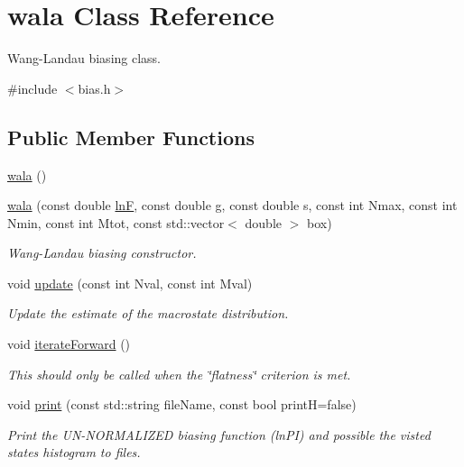 \hypertarget{classwala}{\section{wala Class Reference}
\label{classwala}
}


Wang-\/\-Landau biasing class.  




{\ttfamily \#include $<$bias.\-h$>$}

\subsection*{Public Member Functions}
\begin{DoxyCompactItemize}
\item 
\hyperlink{classwala_a1a4483327eb3527ecc114c075b0b0598}{wala} ()
\item 
\hyperlink{classwala_ac0d2f33ee8226fb4306628a750ed0d14}{wala} (const double \hyperlink{classwala_acb8e59580d97bc3c5b9b4ff45eb6bb9a}{ln\-F}, const double g, const double s, const int Nmax, const int Nmin, const int Mtot, const std\-::vector$<$ double $>$ box)
\begin{DoxyCompactList}\small\item\em Wang-\/\-Landau biasing constructor. \end{DoxyCompactList}\item 
void \hyperlink{classwala_ab439e3f60bea6c54522a870b9ad67acf}{update} (const int Nval, const int Mval)
\begin{DoxyCompactList}\small\item\em Update the estimate of the macrostate distribution. \end{DoxyCompactList}\item 
void \hyperlink{classwala_ae06c2f1475702ec9d1b0a243b7f34e4b}{iterate\-Forward} ()
\begin{DoxyCompactList}\small\item\em This should only be called when the \char`\"{}flatness\char`\"{} criterion is met. \end{DoxyCompactList}\item 
void \hyperlink{classwala_a65569289fac85d0da9c336e17c9d809a}{print} (const std\-::string file\-Name, const bool print\-H=false)
\begin{DoxyCompactList}\small\item\em Print the U\-N-\/\-N\-O\-R\-M\-A\-L\-I\-Z\-E\-D biasing function (ln\-P\-I) and possible the visted states histogram to files. \end{DoxyCompactList}\item 

\end{DoxyCompactItemize}
